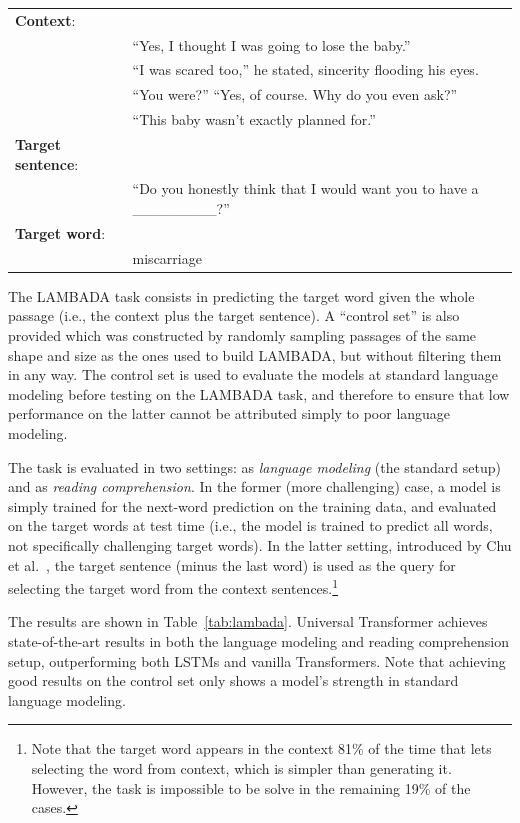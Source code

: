 \begin{table}[h!]
\fontsize{8}{10}\selectfont
\begin{tabular}{l l}
\textbf{Context}: & \\
& ``Yes, I thought I was going to lose the baby.'' \\
&  ``I was scared too,'' he stated, sincerity flooding his eyes. \\ 
&  ``You were?'' ``Yes, of course. Why do you even ask?''  \\
&  ``This baby wasn't exactly planned for.''
\\
\textbf{Target sentence}: & \\
& ``Do you honestly think that I would want you to have a \_\_\_\_\_\_\_\_?'' 
\\
\textbf{Target word}:  & \\  
& miscarriage
\end{tabular}
\end{table}

The LAMBADA task consists in predicting the target word given the whole passage (i.e., the context plus the target sentence). A ``control set''  is also provided which was constructed by randomly sampling passages of the same shape and size as the ones used to build LAMBADA, but without filtering them in any way. The control set is used to evaluate the models at standard language modeling before testing on the LAMBADA task, and therefore to ensure that low performance on the latter cannot be attributed simply to poor language modeling.

The task is evaluated in two settings: as \emph{language modeling} (the standard setup) and as \emph{reading comprehension}. In the former (more challenging) case, a model is simply trained for the next-word prediction on the training data, and evaluated on the target words at test time (i.e., the model is trained to predict all words, not specifically challenging target words).  In the latter setting, introduced by Chu et al.~\cite{chu2017broad}, the target sentence (minus the last word) is used as the query for selecting the target word from the context sentences.\footnote{Note that the target word appears in the context 81\% of the time that lets selecting the word from context, which is simpler than generating it. However, the task is impossible to be solve in the remaining 19\% of the cases.} 



The results are shown in Table~\ref{tab:lambada}. Universal Transformer achieves state-of-the-art results in both the language modeling and reading comprehension setup, outperforming both LSTMs and vanilla Transformers. Note that achieving good results on the control set only shows a model's strength in standard language modeling.

